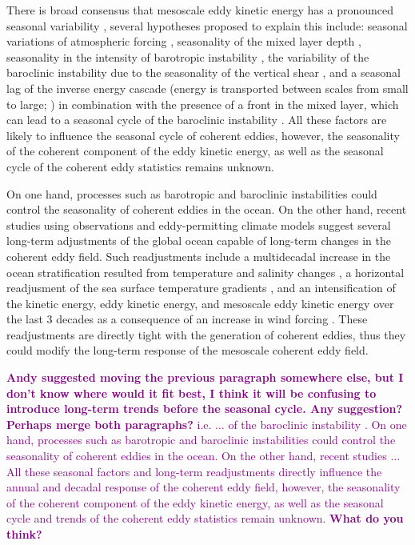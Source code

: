 \documentclass[draft,linenumbers]{agujournal2019}
\begin{document}
There is broad consensus that mesoscale eddy kinetic energy has a pronounced seasonal variability \citep{Uchida_Seasonality_2017,Kang_On_2017,Qiu_seasonal_2004, Qiu_seasonal_1999}, several hypotheses proposed to explain this include: seasonal variations of atmospheric forcing \citep{Sasaki_seasonal_2014}, seasonality of the mixed layer depth \citep{Qiu_seasonal_2014,Callies_season_2015}, seasonality in the intensity of barotropic instability \citep{Qiu_seasonal_2004}, the variability of the baroclinic instability due to the seasonality of the vertical shear \citep{Qiu_seasonal_1999}, and a seasonal lag of the inverse energy cascade (energy is transported between scales from small to large; \citealp{Arbic_cascade_2013}) in combination with the presence of a front in the mixed layer, which can lead to a seasonal cycle of the baroclinic instability \citep{Qiu_seasonal_2014}. 
All these factors are likely to influence the seasonal cycle of coherent eddies, however, the seasonality of the coherent component of the eddy kinetic energy, as well as the seasonal cycle of the coherent eddy statistics remains unknown.


On one hand, processes such as barotropic and baroclinic instabilities could control the seasonality of coherent eddies in the ocean. 
On the other hand, recent studies using observations and eddy-permitting climate models suggest several long-term adjustments of the global ocean capable of long-term changes in the coherent eddy field. 
Such readjustments include a multidecadal increase in the ocean stratification resulted from temperature and salinity changes \citep{Li_stratification_2020}, a horizontal readjusment of the sea surface temperature gradients \citep{Ruela_SST_trends_2020,Bouali_SST_grad_trends_2017,Cane_SST_trends_1997}, and an intensification of the kinetic energy, eddy kinetic energy, and mesoscale eddy kinetic energy over the last 3 decades as a consequence of an increase in wind forcing \citep{Hu_acceleration_2020,Wunsch_speeding_2020,Martinez_Kinetic_2021}. 
These readjustments are directly tight with the generation of coherent eddies, thus they could modify the long-term response of the mesoscale coherent eddy field. 

\textcolor{purple}{\scriptsize \textbf{Andy suggested moving the previous paragraph somewhere else, but I don't know where would it fit best, I think it will be confusing to introduce long-term trends before the seasonal cycle. Any suggestion? Perhaps merge both paragraphs?} i.e. $\dots$ of the baroclinic instability \citep{Qiu_seasonal_2014}. On one hand, processes such as barotropic and baroclinic instabilities could control the seasonality of coherent eddies in the ocean.  On the other hand, recent studies $\dots$ All these seasonal factors and long-term readjustments directly influence the annual and decadal response of the coherent eddy field, however, the seasonality of the coherent component of the eddy kinetic energy, as well as the seasonal cycle and trends of the coherent eddy statistics remain unknown. \textbf{What do you think?}}
\end{document}
